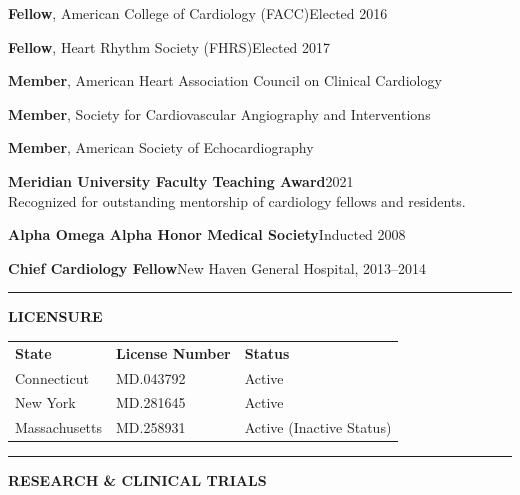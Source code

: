 \documentclass[11pt,a4paper]{article}
\newcommand{\cvsection}[1]{%
  \vspace{1.2em}%
  \noindent
  {\color{primary}\rule{3.5pt}{15pt}}\hspace{8pt}%
  {\color{primary}\Large\bfseries\MakeUppercase{#1}}%
  \vspace{0.2em}%
  \par\noindent{\color{primary!25}\rule{\textwidth}{0.5pt}}%
  \vspace{0.6em}%
}
\begin{document}
\vspace{-2pt}
{\color{darktext}
\noindent\textbf{Fellow}, American College of Cardiology (FACC)\hfill Elected 2016

\vspace{2pt}
\noindent\textbf{Fellow}, Heart Rhythm Society (FHRS)\hfill Elected 2017

\vspace{2pt}
\noindent\textbf{Member}, American Heart Association Council on Clinical Cardiology

\vspace{2pt}
\noindent\textbf{Member}, Society for Cardiovascular Angiography and Interventions

\vspace{2pt}
\noindent\textbf{Member}, American Society of Echocardiography

\vspace{4pt}
\noindent\textbf{\color{primary}Meridian University Faculty Teaching Award}\hfill 2021\\
Recognized for outstanding mentorship of cardiology fellows and residents.

\vspace{2pt}
\noindent\textbf{\color{primary}Alpha Omega Alpha Honor Medical Society}\hfill Inducted 2008

\vspace{2pt}
\noindent\textbf{\color{primary}Chief Cardiology Fellow}\hfill New Haven General Hospital, 2013--2014
}

\cvsection{Licensure}

\vspace{-2pt}
{\color{darktext}
\noindent
\begin{tabular}{p{3.5cm} p{3.5cm} p{3.5cm}}
\rowcolor{lightbg}
\textbf{\color{primary}State} & \textbf{\color{primary}License Number} & \textbf{\color{primary}Status} \\{}
Connecticut & MD.043792 & Active \\{}
New York & MD.281645 & Active \\{}
Massachusetts & MD.258931 & Active (Inactive Status)
\end{tabular}
}

\cvsection{Research \& Clinical Trials}
\end{document}
